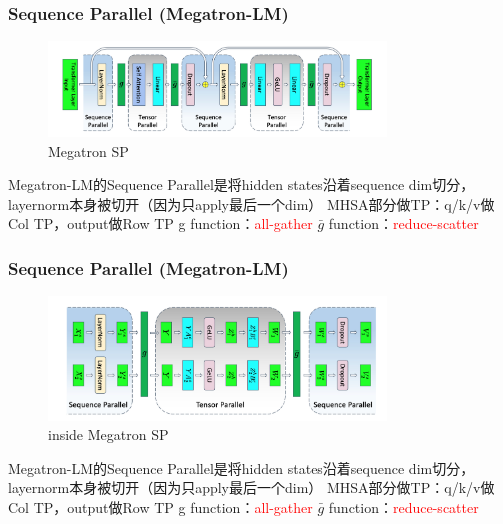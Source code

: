 \documentclass{beamer}
\begin{document}
\begin{frame}[fragile]
\frametitle{Sequence Parallel (Megatron-LM)}

\begin{figure}[h]
    \centering
    \includegraphics[width=0.8\textwidth]{megatron_sp.png}
    \captionsetup{labelformat=empty}
    \caption{Megatron SP}
\end{figure}

Megatron-LM的Sequence Parallel是将hidden states沿着sequence dim切分，layernorm本身被切开（因为只apply最后一个dim）\newline
MHSA部分做TP：q/k/v做Col TP，output做Row TP\newline
g function：\textcolor{red}{all-gather}\newline
$\bar{g}$ function：\textcolor{red}{reduce-scatter}

\end{frame}


\begin{frame}[fragile]
\frametitle{Sequence Parallel (Megatron-LM)}

\begin{figure}[h]
    \centering
    \includegraphics[width=0.8\textwidth]{megatron_sp_inside.png}
    \captionsetup{labelformat=empty}
    \caption{inside Megatron SP}
\end{figure}

Megatron-LM的Sequence Parallel是将hidden states沿着sequence dim切分，layernorm本身被切开（因为只apply最后一个dim）\newline
MHSA部分做TP：q/k/v做Col TP，output做Row TP\newline
g function：\textcolor{red}{all-gather}\newline
$\bar{g}$ function：\textcolor{red}{reduce-scatter}

\end{frame}
\end{document}
